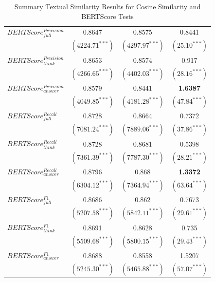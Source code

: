 \begin{table}[htp]
\begin{tabular}{l c c c}
        $BERTScore_{full}^{Precision}$&0.8647&0.8575&0.8441\\ 
                    &$({4224.71}^{***})$&$({4297.97}^{***})$&$({25.10}^{***})$\\ 
        $BERTScore_{think}^{Precision}$&0.8653&0.8574&0.917\\ 
                    &$({4266.65}^{***})$&$({4402.03}^{***})$&$({28.16}^{***})$\\ 
        $BERTScore_{answer}^{Precision}$&0.8579&0.8441&\textbf{1.6387}\\ 
                    &$({4049.85}^{***})$&$({4181.28}^{***})$&$({47.84}^{***})$\\ 

        \hline
        $BERTScore_{full}^{Recall}$&0.8728&0.8664&0.7372\\ 
                    &$({7081.24}^{***})$&$({7889.06}^{***})$&$({37.86}^{***})$\\ 
        $BERTScore_{think}^{Recall}$&0.8728&0.8681&0.5398\\ 
                    &$({7361.39}^{***})$&$({7787.30}^{***})$&$({28.21}^{***})$\\ 
        $BERTScore_{answer}^{Recall}$&0.8796&0.868&\textbf{1.3372}\\ 
                    &$({6304.12}^{***})$&$({7364.94}^{***})$&$({63.64}^{***})$\\ 

        \hline
        $BERTScore_{full}^{F1}$&0.8686&0.862&0.7673\\ 
                    &$({5207.58}^{***})$&$({5842.11}^{***})$&$({29.61}^{***})$\\ 
        $BERTScore_{think}^{F1}$&0.8691&0.8628&0.735\\ 
                    &$({5509.68}^{***})$&$({5800.15}^{***})$&$({29.43}^{***})$\\ 
        $BERTScore_{answer}^{F1}$&0.8688&0.8558&1.5207\\ 
                    &$({5245.30}^{***})$&$({5465.88}^{***})$&$({57.07}^{***})$\\ 
        \bottomrule
    \end{tabular}
    \caption{Summary Textual Similarity Results for Cosine Similarity and BERTScore Tests}
    \label{tab:ch2:result_cos_stage2_synthetic}
\end{table}



